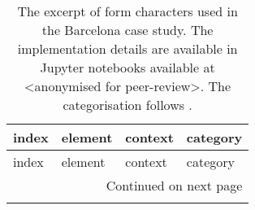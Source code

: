 
\small
\begin{longtable}{p{5cm}p{4cm}p{4cm}l}
\caption{The excerpt of form characters used in the Barcelona case study. The implementation details are available
in Jupyter notebooks available at <anonymised for peer-review>. The categorisation follows \cite{fleischmann2020measuring}.}
\label{tab:bcn_form_excerpt} \\
\toprule
                               index &                         element &                    context &     category \\
\midrule
\endfirsthead

\toprule
                               index &                         element &                    context &     category \\
\midrule
\endhead
\midrule
\multicolumn{4}{r}{{Continued on next page}} \\
\midrule
\endfoot


\end{longtable}
